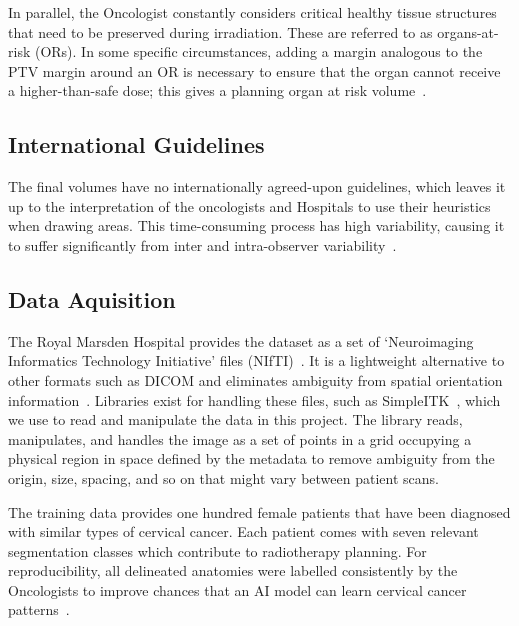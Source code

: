 \documentclass[12pt,twoside]{report}
\begin{document}
In parallel, the Oncologist constantly considers critical healthy tissue structures that need to be preserved during irradiation. These are referred to as organs-at-risk (ORs). In some specific circumstances, adding a margin analogous to the PTV margin around an OR is necessary to ensure that the organ cannot receive a higher-than-safe dose; this gives a planning organ at risk volume~\cite{defining-target-volumes}.

\subsection{International Guidelines}

The final volumes have no internationally agreed-upon guidelines, which leaves it up to the interpretation of the oncologists and Hospitals to use their heuristics when drawing areas. This time-consuming process has high variability, causing it to suffer significantly from inter and intra-observer variability~\cite{Lin2021-oz}. 


\subsection{Data Aquisition}

The Royal Marsden Hospital provides the dataset as a set of `Neuroimaging Informatics Technology Initiative' files (NIfTI)~\cite{file-formats}. It is a lightweight alternative to other formats such as DICOM and eliminates ambiguity from spatial orientation information~\cite{dicom-to-nifti-conversion}. Libraries exist for handling these files, such as SimpleITK~\cite{SimpleITK-paper}, which we use to read and manipulate the data in this project. The library reads, manipulates, and handles the image as a set of points in a grid occupying a physical region in space defined by the metadata to remove ambiguity from the origin, size, spacing, and so on that might vary between patient scans.

The training data provides one hundred female patients that have been diagnosed with similar types of cervical cancer. Each patient comes with seven relevant segmentation classes which contribute to radiotherapy planning. For reproducibility, all delineated anatomies were labelled consistently by the Oncologists to improve chances that an AI model can learn cervical cancer patterns~\cite{AMLART-data}. 
\end{document}
